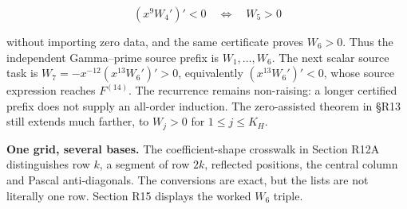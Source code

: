 \documentclass[
  11pt,
]{book}
\begin{document}
\[
\boxed{(x^9W_4')'<0
\quad\Longleftrightarrow\quad W_5>0}
\tag{12.6}
\]

without importing zero data, and the same certificate proves \(W_6>0\).
Thus the independent Gamma--prime source prefix is \(W_1,\ldots,W_6\).
The next scalar source task is \(W_7=-x^{-12}(x^{13}W_6')'>0\),
equivalently \((x^{13}W_6')'<0\), whose source expression reaches
\(F^{(14)}\). The recurrence remains non-raising: a longer certified
prefix does not supply an all-order induction. The zero-assisted theorem
in §R13 still extends much farther, to \(W_j>0\) for \(1\le j\le K_H\).


\textbf{One grid, several bases.} The coefficient-shape crosswalk in
Section R12A distinguishes row \(k\), a segment of row \(2k\), reflected
positions, the central column and Pascal anti-diagonals. The conversions
are exact, but the lists are not literally one row. Section R15 displays
the worked \(W_6\) triple.
\end{document}
